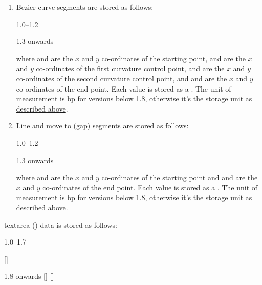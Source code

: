 \begin{numbered}
\begin{enumerate}
    \begin{enumerate}
    \item\label{jdr:bezier} \gls{Bezier-curve} segments are stored as follows:
    \begin{jdrversion}{1.0--1.2}
         
     
    \end{jdrversion}
    \begin{jdrversion}{1.3 onwards}
         
    \end{jdrversion} 
    where  and  are the $x$ and $y$ 
    co-ordinates of the starting point,  and  are the
    $x$ and $y$ co-ordinates of the first curvature control
    point,  and  are the $x$ and
    $y$ co-ordinates of the second curvature control point, and
     and  are the $x$ and $y$ co-ordinates
    of the end point.  Each value is stored as a . The unit of
    measurement is \gls{bp} for versions below 1.8, otherwise it's the storage
    unit as \hyperref[jdr:storageunit]{described above}.
    
    \item\label{jdr:line}
    Line and move to (gap) segments are stored as follows:
    \begin{jdrversion}{1.0--1.2}
       
    \end{jdrversion}
    \begin{jdrversion}{1.3 onwards}
     
    \end{jdrversion}
    where  and  are the $x$ and
    $y$ co-ordinates of the starting point and
     and  are the $x$ and
    $y$ co-ordinates of the end point. Each value is stored as
    a . The unit of
    measurement is \gls{bp} for versions below 1.8, otherwise it's the
    storage unit as \hyperref[jdr:storageunit]{described above}.
    \end{enumerate}%

  \end{enumerate}%

\item\label{jdr:textarea}%
\Gls{textarea} () data is stored as follows:
\begin{jdrversion}{1.0--1.7}
\begin{syntaxline}
 
 []  
\end{syntaxline}
\end{jdrversion}
\begin{jdrversion}{1.8 onwards}
 []
 
 []  
\end{jdrversion}


\end{numbered}
